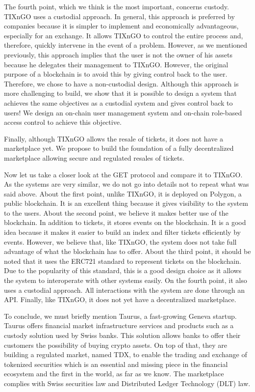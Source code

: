 \documentclass[a4paper,11pt,oneside]{report}
\begin{document}
The fourth point, which we think is the most important, concerns custody. TIXnGO uses a custodial approach. In general, this approach is preferred by companies because it is simpler to implement and economically advantageous, especially for an exchange. It allows TIXnGO to control the entire process and, therefore, quickly intervene in the event of a problem. However, as we mentioned previously, this approach implies that the user is not the owner of his assets because he delegates their management to TIXnGO. However, the original purpose of a blockchain is to avoid this by giving control back to the user. Therefore, we chose to have a non-custodial design. Although this approach is more challenging to build, we show that it is possible to design a system that achieves the same objectives as a custodial system and gives control back to users! We design an on-chain user management system and on-chain role-based access control to achieve this objective.

Finally, although TIXnGO allows the resale of tickets, it does not have a marketplace yet. We propose to build the foundation of a fully decentralized marketplace allowing secure and regulated resales of tickets.

Now let us take a closer look at the GET protocol and compare it to TIXnGO. As the systems are very similar,  we do not go into details not to repeat what was said above. About the first point, unlike TIXnGO, it is deployed on Polygon, a public blockchain. It is an excellent thing because it gives visibility to the system to the users. About the second point, we believe it makes better use of the blockchain. In addition to tickets, it stores events on the blockchain. It is a good idea because it makes it easier to build an index and filter tickets efficiently by events. However, we believe that, like TIXnGO, the system does not take full advantage of what the blockchain has to offer. About the third point, it should be noted that it uses the ERC721 standard to represent tickets on the blockchain. Due to the popularity of this standard, this is a good design choice as it allows the system to interoperate with other systems easily. On the fourth point, it also uses a custodial approach. All interactions with the system are done through an API. Finally, like TIXnGO, it does not yet have a decentralized marketplace.

To conclude, we must briefly mention Taurus, a fast-growing Geneva startup. Taurus offers financial market infrastructure services and products such as a custody solution used by Swiss banks. This solution allows banks to offer their customers the possibility of buying crypto assets. On top of that, they are building a regulated market, named TDX, to enable the trading and exchange of tokenized securities which is an essential and missing piece in the financial ecosystem and the first in the world, as far as we know. The marketplace complies with Swiss securities law and Distributed Ledger Technology (DLT) law.
\end{document}
